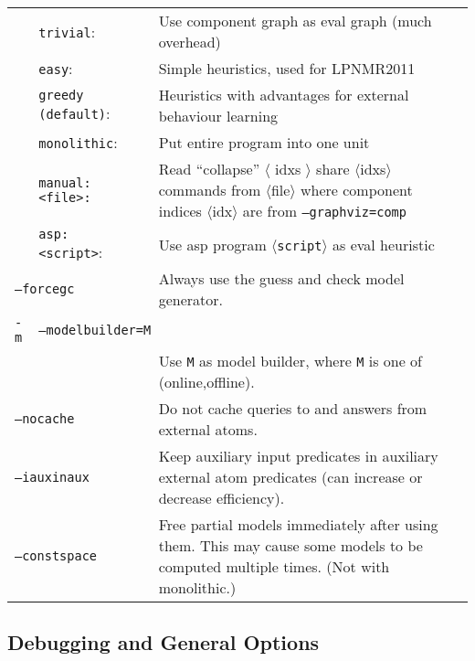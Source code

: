 \documentclass[a4paper, titlepage]{article}
\begin{document}
\begin{longtable}{ p{2.0em} p{2.2cm} p{0.6cm} p{8.0cm} }
&\texttt{trivial}:&&Use component graph as eval graph (much overhead)\\
&\texttt{easy}:&&Simple heuristics, used for LPNMR2011\\
&\texttt{greedy (default)}:&& Heuristics with advantages for external behaviour learning\\
&\texttt{monolithic}:&& Put entire program into one unit\\
&\texttt{manual:<file>:} &&  Read ``collapse'' $\langle$ idxs $\rangle$ share $\langle$idxs$\rangle$ commands from $\langle$file$\rangle$ where component indices $\langle$idx$\rangle$ are from \texttt{--graphviz=comp}\\
&\texttt{asp:<script>}:&&Use asp program $\langle$\texttt{script}$\rangle$ as eval heuristic\\
\multicolumn{3}{l}{\texttt{--forcegc}} &
  Always use the guess and check model generator.\\
\texttt{-m}& \multicolumn{3}{l}{\texttt{--modelbuilder=M}} \\
&&& Use \texttt{M} as model builder, where \texttt{M} is one of (online,offline).\\
\multicolumn{2}{l}{\texttt{--nocache}} &&
  Do not cache queries to and answers from external atoms.\\
\multicolumn{2}{l}{\texttt{--iauxinaux}} &&
  Keep auxiliary input predicates in auxiliary external atom predicates (can increase or decrease efficiency).\\
\multicolumn{2}{l}{\texttt{--constspace}} &&
  Free partial models immediately after using them. This may cause some models to be computed multiple times. (Not with monolithic.)
\end{longtable}

\subsection{Debugging and General Options}
\end{document}
